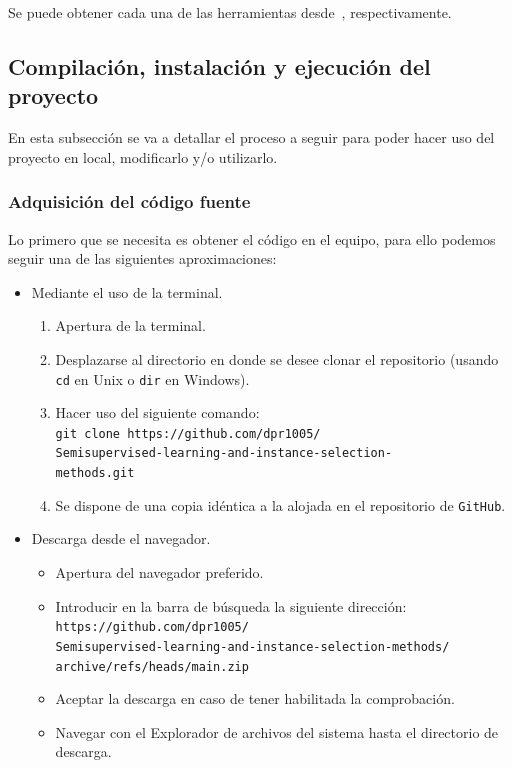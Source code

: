 Se puede obtener cada una de las herramientas desde~\cite{VSCode, PyCharm}, respectivamente.

\subsection{Compilación, instalación y ejecución del proyecto}
En esta subsección se va a detallar el proceso a seguir para poder hacer uso del proyecto en local, modificarlo y/o utilizarlo. 

\subsubsection{Adquisición del código fuente}
Lo primero que se necesita es obtener el código en el equipo, para ello podemos seguir una de las siguientes aproximaciones:
\begin{itemize}
\item Mediante el uso de la terminal.
\begin{enumerate}
\tightlist
\item Apertura de la terminal.
\item Desplazarse al directorio en donde se desee clonar el repositorio (usando \texttt{cd} en Unix o \texttt{dir} en Windows).
\item Hacer uso del siguiente comando:\\
\texttt{git clone https://github.com/dpr1005/\\Semisupervised-learning-and-instance-selection-\\methods.git}
\item Se dispone de una copia idéntica a la alojada en el repositorio de \texttt{GitHub}.
\end{enumerate}

\item Descarga desde el navegador.
\begin{itemize}
\tightlist
\item Apertura del navegador preferido.
\item Introducir en la barra de búsqueda la siguiente dirección:\\
\texttt{https://github.com/dpr1005/\\Semisupervised-learning-and-instance-selection-methods/\\archive/refs/heads/main.zip}
\item Aceptar la descarga en caso de tener habilitada la comprobación.
\item Navegar con el Explorador de archivos del sistema hasta el directorio de descarga.
\end{itemize}


\end{itemize}
